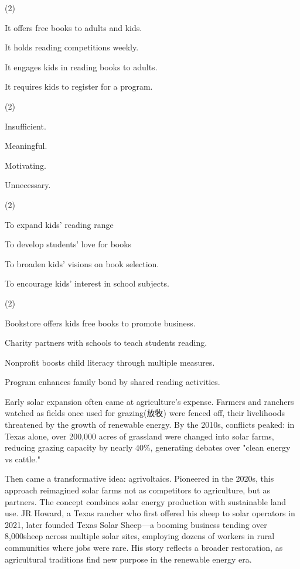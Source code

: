 \documentclass{英语试卷}
\begin{document}
\begin{choices}(2)
  \item It offers free books to adults and kids.
  \item It holds reading competitions weekly.
  \item It engages kids in reading books to adults.
  \item It requires kids to register for a program.
\end{choices}
\begin{choices}(2)
  \item Insufficient.
  \item Meaningful.
  \item Motivating.
  \item Unnecessary.
\end{choices}
\begin{choices}(2)
  \item To expand kids' reading range
  \item To develop students' love for books
  \item To broaden kids' visions on book selection.
  \item To encourage kids' interest in school subjects.
\end{choices}
\begin{choices}(2)
  \item Bookstore offers kids free books to promote business.
  \item Charity partners with schools to teach students reading.
  \item Nonprofit boosts child literacy through multiple measures.
  \item Program enhances family bond by shared reading activities.
\end{choices}
\par Early solar expansion often came at agriculture's expense. Farmers and ranchers watched as fields once used for grazing(放牧) were fenced off, their livelihoods threatened by the growth of renewable energy. By the 2010s, conflicts peaked: in Texas alone, over 200,000 acres of grassland were changed into solar farms, reducing grazing capacity by nearly 40\%, generating debates over "clean energy vs cattle."\par
\par Then came a transformative idea: agrivoltaics. Pioneered in the 2020s, this approach reimagined solar farms not as competitors to agriculture, but as partners. The concept combines solar energy production with sustainable land use. JR Howard, a Texas rancher who first offered his sheep to solar operators in 2021, later founded Texas Solar Sheep—a booming business tending over 8,000sheep across multiple solar sites, employing dozens of workers in rural communities where jobs were rare. His story reflects a broader restoration, as agricultural traditions find new purpose in the renewable energy era.\par
\end{document}
